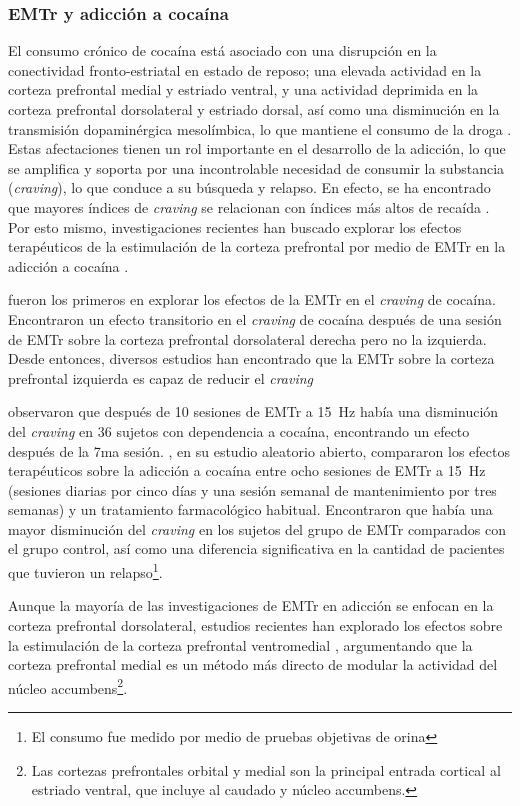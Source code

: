 \subsubsection{EMTr y adicción a cocaína}
El consumo crónico de cocaína está asociado con una disrupción en la conectividad fronto-estriatal en estado de reposo; una elevada actividad en la corteza prefrontal medial y estriado ventral, y una actividad deprimida en la corteza prefrontal dorsolateral y estriado dorsal, así como una disminución en la transmisión dopaminérgica mesolímbica, lo que mantiene el consumo de la droga \parencite{Rachid2018}.
Estas afectaciones tienen un rol importante en el desarrollo de la adicción, lo que se amplifica y soporta por una incontrolable necesidad de consumir la substancia (\textit{craving}), lo que conduce a su búsqueda y relapso.
En efecto, se ha encontrado que mayores índices de \textit{craving} se relacionan con índices más altos de recaída \parencite{Sinha2006,Volkow2000a,Volkow2016}.
Por esto mismo, investigaciones recientes han buscado explorar los efectos terapéuticos de la estimulación de la corteza prefrontal por medio de EMTr en la adicción a cocaína \parencite{Bolloni2018}. \par
\textcite{Camprodon2007} fueron los primeros en explorar los efectos de la EMTr en el \textit{craving} de cocaína.
Encontraron un efecto transitorio en el \textit{craving} de cocaína después de una sesión de EMTr sobre la corteza prefrontal dorsolateral derecha \textemdash{}pero no la izquierda.
Desde entonces, diversos estudios han encontrado que la EMTr sobre la corteza prefrontal izquierda es capaz de reducir el \textit{craving} \par
\textcite{Politi2008} observaron que después de 10 sesiones de EMTr a \SI{15}{\hertz} había una disminución del \textit{craving} en 36 sujetos con dependencia a cocaína, encontrando un efecto después de la 7ma sesión.
\textcite{Terraneo2016}, en su estudio aleatorio abierto, compararon los efectos terapéuticos sobre la adicción a cocaína entre ocho sesiones de EMTr a \SI{15}{\hertz} (sesiones diarias por cinco días y una sesión semanal de mantenimiento por tres semanas) y un tratamiento farmacológico habitual.
Encontraron que había una mayor disminución del \textit{craving} en los sujetos del grupo de EMTr comparados con el grupo control, así como una diferencia significativa en la cantidad de pacientes que tuvieron un relapso\footnote{El consumo fue medido por medio de pruebas objetivas de orina}. \par
Aunque la mayoría de las investigaciones de EMTr en adicción se enfocan en la corteza prefrontal dorsolateral, estudios recientes han explorado los efectos sobre la estimulación de la corteza prefrontal ventromedial \parencite{Hanlon2015,Kearney-Ramos2018a}, argumentando que la corteza prefrontal medial es un método más directo de modular la actividad del núcleo accumbens\footnote{Las cortezas prefrontales orbital y medial son la principal entrada cortical al estriado ventral, que incluye al caudado y núcleo accumbens.}.
